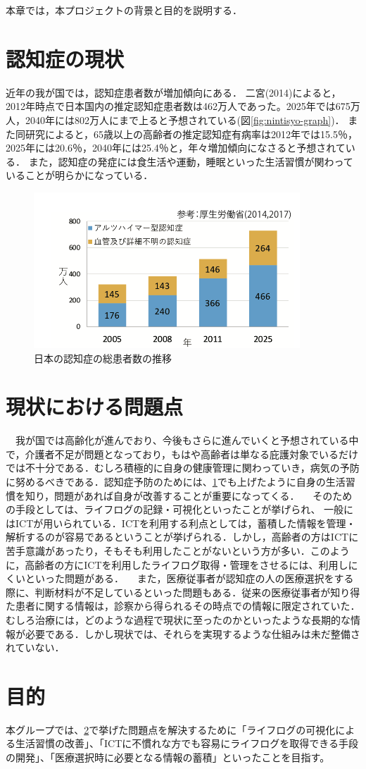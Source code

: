 \documentclass[../report]{subfiles}
\begin{document}
本章では，本プロジェクトの背景と目的を説明する．

\section{認知症の現状} \label{sec:genzyou}
近年の我が国では，認知症患者数が増加傾向にある．
二宮(2014)によると，2012年時点で日本国内の推定認知症患者数は462万人であった\cite{syourai}。2025年では675万人，2040年には802万人にまで上ると予想されている(図\ref{fig:nintisyo-graph})．
また同研究によると，65歳以上の高齢者の推定認知症有病率は2012年では15.5％，2025年には20.6％，2040年には25.4％と，年々増加傾向になさると予想されている\cite{syourai}．
また，認知症の発症には食生活や運動，睡眠といった生活習慣が関わっていることが明らかになっている\cite{seikatsu}．
\begin{figure}[htbp]
    \begin{center}
        \includegraphics[width=10cm]{imgs/ninchisyo-graph.png}
        \caption{日本の認知症の総患者数の推移}
        \label{fig:ninchisyo-graph}
    \end{center}
\end{figure}

\section{現状における問題点} \label{sec:mondai}
　我が国では高齢化が進んでおり、今後もさらに進んでいくと予想されている中で，介護者不足が問題となっており，もはや高齢者は単なる庇護対象でいるだけでは不十分である\cite{kaigo}．むしろ積極的に自身の健康管理に関わっていき，病気の予防に努めるべきである．認知症予防のためには、\ref{sec:genzyou}でも上げたように自身の生活習慣を知り，問題があれば自身が改善することが重要になってくる．
　そのための手段としては、ライフログの記録・可視化といったことが挙げられ\cite{lifelog}、 一般にはICTが用いられている．ICTを利用する利点としては，蓄積した情報を管理・解析するのが容易であるということが挙げられる．しかし，高齢者の方はICTに苦手意識があったり，そもそも利用したことがないという方が多い．このように，高齢者の方にICTを利用したライフログ取得・管理をさせるには、利用しにくいといった問題がある．
　また，医療従事者が認知症の人の医療選択をする際に、判断材料が不足しているといった問題もある．従来の医療従事者が知り得た患者に関する情報は，診察から得られるその時点での情報に限定されていた．むしろ治療には，どのような過程で現状に至ったのかといったような長期的な情報が必要である．しかし現状では、それらを実現するような仕組みは未だ整備されていない．

\section{目的}
本グループでは、\ref{sec:mondai}で挙げた問題点を解決するために「ライフログの可視化による生活習慣の改善」、「ICTに不慣れな方でも容易にライフログを取得できる手段の開発」、「医療選択時に必要となる情報の蓄積」といったことを目指す。
\end{document}
